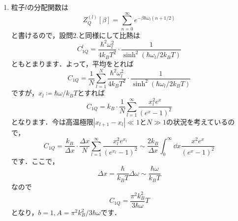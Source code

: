 \documentclass[a4paper,pdflatex,ja=standard]{bxjsarticle}
\begin{document}
\begin{enumerate}
  \item 
  粒子$l$の分配関数は
  \begin{equation}
    Z^{(l)}_Q[\beta]
    =
    \sum_{n=0}^{\infty}e^{-\beta\hbar\omega_l(n+1/2)}
  \end{equation}
  と書けるので，設問2.と同様にして比熱は
  \begin{equation}
    C_{1Q}^{l}
    =
    \frac{\hbar^2\omega_l^2}{4k_BT^2}
    \cdot
    \frac{1}{\sinh^2(\hbar\omega_l/2k_BT)}
  \end{equation}
  ともとまります．よって，平均をとれば
  \begin{equation}
    C_{1Q}
    =
    \frac{1}{N}
    \sum_{l=1}^{N}
    \frac{\hbar^2\omega_l^2}{4k_BT^2}
    \cdot
    \frac{1}{\sinh^2(\hbar\omega_l/2k_BT)}
  \end{equation}
  ですが，$x_l\coloneqq \hbar\omega/k_BT$とすれば
  \begin{equation}
    C_{1Q}
    =
    k_B
    \cdot
    \frac{1}{N}
    \sum_{l=1}^{\infty}
    \frac{x_l^2e^x}{(e^x-1)^2}
  \end{equation}
  となります．今は高温極限$|x_{l+1}-x_l|\ll 1$と$N\gg 1$の状況を考えているので，
  \begin{equation}
    C_{1Q}
    =
    \frac{k_B}{\Delta x}
    \cdot
    \frac{\Delta x}{N}
    \sum_{l=1}^{\infty}
    \frac{x_l^2e^{x_l}}{(e^{x_l}-1)^2}
    \sim
    \frac{2k_B}{\Delta x}
    \int_0^\infty
    \dd x
    \frac{x^2e^x}{(e^x-1)^2}
  \end{equation}
  です．ここで，
  \begin{equation}
    \Delta x
    =
    \frac{\hbar}{k_BT}\Delta\omega
    \sim
    \frac{\hbar\omega}{k_BT}
  \end{equation}
  なので
  \begin{equation}
    C_{1Q}
    =
    \frac{\pi^2k_B^2}{3\hbar\omega}T
  \end{equation}
  となり，$b=1,A=\pi^2k_B^2/3\hbar\omega$です．


\end{enumerate}
\end{document}
